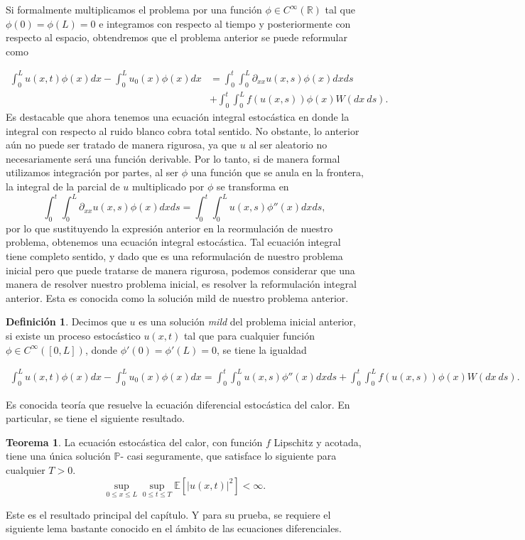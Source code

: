 \documentclass[letterpaper,twoside,12pt]{book}
\newcommand{\R}{\mathbb{R}}
\newcommand{\E}{\mathbb{E}}
\renewcommand{\P}{\mathbb{P}}
\newcommand{\1}{\mathds{1}}
\newcommand{\abs}[1]{\left\lvert #1 \right\rvert}
\theoremstyle{definition}
\newtheorem{dfn}{Definición}
\theoremstyle{definition}
\newtheorem{teo}{Teorema}
\theoremstyle{definition}
\theoremstyle{definition}
\theoremstyle{definition}
\theoremstyle{definition}
\theoremstyle{definition}
\begin{document}
Si formalmente multiplicamos el problema por una función $\phi \in C^{\infty}(\R)$ tal que $\phi(0)=\phi(L)=0$ e integramos con respecto al tiempo y posteriormente con respecto al espacio, obtendremos que el problema anterior se puede reformular como 

\begin{align*}
    \int_{0}^{L}u(x,t)\phi(x)dx-\int_{0}^{L}u_0(x)\phi(x)dx&=\int_0^{t}\int_0^{L}\partial_{xx}u(x,s)\phi(x)dxds\\
    &+\int_{0}^{t}\int_{0}^{L}f(u(x,s))\phi(x)W(dx \ ds).    
    \end{align*}
Es destacable que ahora tenemos una ecuación integral estocástica en donde la integral con respecto al ruido blanco cobra total sentido. No obstante, lo anterior aún no puede ser tratado de manera rigurosa, ya que $u$ al ser aleatorio no necesariamente será una función derivable. Por lo tanto, si de manera formal utilizamos integración por partes, al ser $\phi$ una función que se anula en la frontera, la integral de la parcial de $u$ multiplicado por $\phi$ se transforma en
\[
    \int_{0}^{t}\int_{0}^{L}\partial_{xx}u(x,s)\phi(x)dx ds=\int_{0}^{t}\int_{0}^{L}u(x,s)\phi''(x)dx ds,
\]
por lo que sustituyendo la expresión anterior en la reormulación de nuestro problema, obtenemos una ecuación integral estocástica. Tal ecuación integral tiene completo sentido, y dado que es una reformulación de nuestro problema inicial pero que puede tratarse de manera rigurosa, podemos considerar que una manera de resolver nuestro problema inicial, es resolver la reformulación integral anterior. Esta es conocida como la solución mild de nuestro problema anterior.

\begin{dfn} 
 Decimos que $u$ es una solución \textit{mild} del problema inicial anterior, si existe un proceso estocástico $u(x,t)$ tal que para cualquier función $\phi\in C^{\infty}([0,L])$, donde $\phi'(0)=\phi'(L)=0$, se tiene la igualdad 

\begin{align*}
    \int_{0}^{L}u(x,t)\phi(x)dx-\int_{0}^{L}u_0(x)\phi(x)dx=\int_{0}^{t}\int_{0}^{L}u(x,s)\phi''(x)dx ds+\int_{0}^{t}\int_{0}^{L}f(u(x,s))\phi(x)W(dx \ ds).  
\end{align*}
\end{dfn}

Es conocida teoría que resuelve la ecuación diferencial estocástica del calor. En particular, se tiene el siguiente resultado.

\begin{teo} 
 La ecuación estocástica del calor, con función $f$ Lipschitz y acotada, tiene una única solución $\P$- casi seguramente, que satisface lo siguiente para cualquier $T>0$.
 \[
 \sup_{0\leq x\leq L}\sup_{0\leq t \leq T}\E\left[\abs{u(x,t)}^2\right]<\infty.   
 \]
 \end{teo}
Este es el resultado principal del capítulo. Y para su prueba, se requiere el siguiente lema bastante conocido en el ámbito de las ecuaciones diferenciales.
\end{document}
